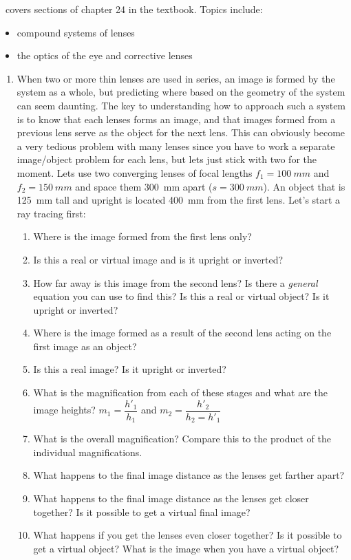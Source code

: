 \week \ covers sections of chapter 24 in the textbook. Topics include:

\begin{itemize}
	\item compound systems of lenses
	\item the optics of the eye and corrective lenses
\end{itemize}

\begin{enumerate}
\setlength\itemsep{2 in}

\item
When two or more thin lenses are used in series, an image is formed by the system as a whole, but predicting where based on the geometry of the system can seem daunting. The key to understanding how to approach such a system is to know that each lenses forms an image, and that images formed from a previous lens serve as the object for the next lens. This can obviously become a very tedious problem with many lenses since you have to work a separate image/object problem for each lens, but lets just stick with two for the moment. Lets use two converging lenses of focal lengths $f_1=\SI{+100}{mm}$ and $f_2=\SI{+150}{mm}$ and space them \SI{300}{mm} apart ($s=\SI{300}{mm}$). An object that is \SI{125}{mm} tall and upright is located \SI{400}{mm} from the first lens. Let's start a ray tracing first:

\vspace{6cm}

\begin{enumerate}
	\setlength\itemsep{1 in}
	\item Where is the image formed from the first lens only?
	\item Is this a real or virtual image and is it upright or inverted?
	\item How far away is this image from the second lens? Is there a \emph{general} equation you can use to find this? Is this a real or virtual object? Is it upright or inverted?
	\item Where is the image formed as a result of the second lens acting on the first image as an object?
	\item Is this a real image? Is it upright or inverted?
	\item What is the magnification from each of these stages and what are the image heights? $m_1=\dfrac{h'_1}{h_1}$ and $m_2=\dfrac{h'_2}{h_2=h'_1}$
	\item What is the overall magnification? Compare this to the product of the individual magnifications.
	\item What happens to the final image distance as the lenses get farther apart?
	\item What happens to the final image distance as the lenses get closer together? Is it possible to get a virtual final image?
	\item What happens if you get the lenses even closer together? Is it possible to get a virtual object? What is the image when you have a virtual object?
\end{enumerate}


\end{enumerate}
